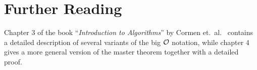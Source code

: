 \section{Further Reading}
Chapter 3 of the book ``\emph{Introduction to Algorithms}'' by Cormen et.~al.~\cite{cormen:09}
contains a detailed description of several variants of the big $\mathcal{O}$ notation, while chapter 4 gives a more
general version of the master theorem together with a detailed proof.


